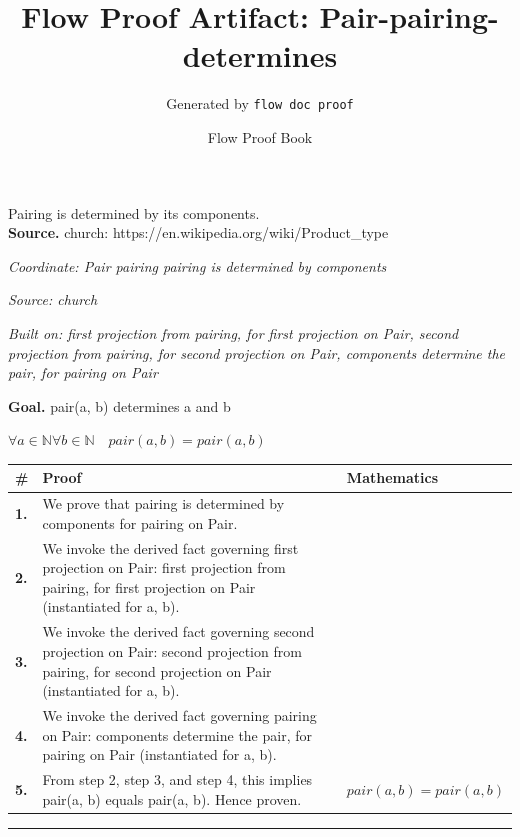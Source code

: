 \documentclass[11pt]{article}
\title{Flow Proof Artifact: Pair-pairing-determines}
\author{Generated by \texttt{flow doc proof}}
\date{Flow Proof Book}
\theoremstyle{definition}
\begin{document}
\maketitle
Pairing is determined by its components.\\[0.5em]
\textbf{Source.} church: https://en.wikipedia.org/wiki/Product\_type\\[0.5em]
\bigskip
{}\par
\smallskip\noindent\textit{Coordinate: Pair \cdot pairing \cdot pairing is determined by components}\par
\smallskip\noindent\textit{Source: church}\par
\smallskip\noindent\textit{Built on: first projection from pairing, for first projection on Pair, second projection from pairing, for second projection on Pair, components determine the pair, for pairing on Pair}\par
\medskip
\noindent\textbf{Goal.} pair(a, b) determines a and b\par
\noindent$\displaystyle \forall a \in \mathbb{N} \forall b \in \mathbb{N}\quad pair(a, b) = pair(a, b)$\par
\medskip
\noindent
\begin{tabular}{@{} >{\raggedright\arraybackslash}p{} >{\raggedright\arraybackslash}p{} >{\raggedleft\arraybackslash}p{} @{}}
\textbf{\#} & \textbf{Proof} & \textbf{Mathematics} \\
\midrule
\textbf{1.} & We prove that pairing is determined by components for pairing on Pair. & \\[0.45em]
\textbf{2.} & We invoke the derived fact governing first projection on Pair: first projection from pairing, for first projection on Pair (instantiated for a, b). & \\[0.45em]
\textbf{3.} & We invoke the derived fact governing second projection on Pair: second projection from pairing, for second projection on Pair (instantiated for a, b). & \\[0.45em]
\textbf{4.} & We invoke the derived fact governing pairing on Pair: components determine the pair, for pairing on Pair (instantiated for a, b). & \\[0.45em]
\textbf{5.} & From step 2, step 3, and step 4, this implies pair(a, b) equals pair(a, b). Hence proven. & $\displaystyle pair(a, b) = pair(a, b)$ \\[0.45em]
\bottomrule
\end{tabular}
\label{thm:Pair-pairing-pairing_is_determined_by_components}
\par\medskip\hrule
\end{document}
